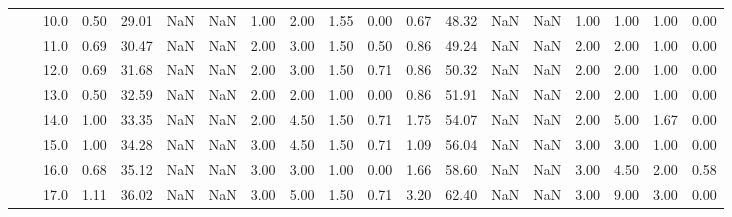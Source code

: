 \begin{tabular}{lllrrrrrrrrrrrrrrrr}
          &     & 10.0 &      0.50 &      29.01 &               NaN &                NaN &  1.00 &   2.00 &             1.55 &                         0.00 &      0.67 &      48.32 &               NaN &                NaN &  1.00 &   1.00 &             1.00 &                         0.00 \\
          &     & 11.0 &      0.69 &      30.47 &               NaN &                NaN &  2.00 &   3.00 &             1.50 &                         0.50 &      0.86 &      49.24 &               NaN &                NaN &  2.00 &   2.00 &             1.00 &                         0.00 \\
          &     & 12.0 &      0.69 &      31.68 &               NaN &                NaN &  2.00 &   3.00 &             1.50 &                         0.71 &      0.86 &      50.32 &               NaN &                NaN &  2.00 &   2.00 &             1.00 &                         0.00 \\
          &     & 13.0 &      0.50 &      32.59 &               NaN &                NaN &  2.00 &   2.00 &             1.00 &                         0.00 &      0.86 &      51.91 &               NaN &                NaN &  2.00 &   2.00 &             1.00 &                         0.00 \\
          &     & 14.0 &      1.00 &      33.35 &               NaN &                NaN &  2.00 &   4.50 &             1.50 &                         0.71 &      1.75 &      54.07 &               NaN &                NaN &  2.00 &   5.00 &             1.67 &                         0.00 \\
          &     & 15.0 &      1.00 &      34.28 &               NaN &                NaN &  3.00 &   4.50 &             1.50 &                         0.71 &      1.09 &      56.04 &               NaN &                NaN &  3.00 &   3.00 &             1.00 &                         0.00 \\
          &     & 16.0 &      0.68 &      35.12 &               NaN &                NaN &  3.00 &   3.00 &             1.00 &                         0.00 &      1.66 &      58.60 &               NaN &                NaN &  3.00 &   4.50 &             2.00 &                         0.58 \\
          &     & 17.0 &      1.11 &      36.02 &               NaN &                NaN &  3.00 &   5.00 &             1.50 &                         0.71 &      3.20 &      62.40 &               NaN &                NaN &  3.00 &   9.00 &             3.00 &                         0.00 \\

\end{tabular}

